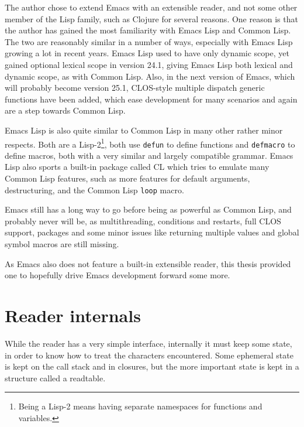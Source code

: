 \documentclass[a4paper]{article}
\newcommand{\el}{Emacs Lisp}
\newcommand{\cl}{Common Lisp}
\newcommand{\sym}[1]{\texttt{#1}}
\newcommand{\fun}[1]{\texttt{#1}}
\begin{document}
The author chose to extend Emacs with an extensible reader, and not some other
member of the Lisp family, such as Clojure for several reasons.  One reason is
that the author has gained the most familiarity with \el{} and \cl{}.  The two
are reasonably similar in a number of ways, especially with \el{} growing a lot
in recent years.  \el{} used to have only dynamic scope, yet gained optional
lexical scope in version 24.1\cite{Emacs-Lexical},%
giving \el{} both lexical and dynamic scope, as with \cl{}.  Also, in the next
version of Emacs, which will probably become version
25.1\cite{emacs-pretest},%
CLOS-style multiple dispatch generic functions have been added, which ease
development for many scenarios and again are a step towards \cl{}.

\el{} is also quite similar to \cl{} in many other rather minor respects.  Both
are a Lisp-2\footnote{Being a Lisp-2 means having separate namespaces for
  functions and variables.}, both use \sym{defun} to define functions and
\sym{defmacro} to define macros, both with a very similar and largely compatible
grammar.  \el{} also sports a built-in package called CL which tries to emulate
many \cl{} features, such as more features for default arguments, destructuring,
and the \cl{} \fun{loop} macro.

Emacs still has a long way to go before being as powerful as \cl{}, and probably
never will be, as multithreading, conditions and restarts, full CLOS support,
packages and some minor issues like returning multiple values and global symbol
macros are still missing.

As Emacs also does not feature a built-in extensible reader, this thesis
provided one to hopefully drive Emacs development forward some more.

\section{Reader internals}
\label{sec:reader-internals}

While the reader has a very simple interface, internally it must keep some
state, in order to know how to treat the characters encountered.  Some ephemeral
state is kept on the call stack and in closures, but the more important state is
kept in a structure called a readtable.
\end{document}
